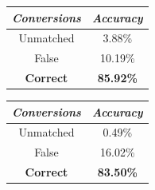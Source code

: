 \documentclass{article}
\begin{document}
\begin{minipage}{0.45\textwidth}
	\centering
	\begin{tabular}{|| c | c ||}
	\hline
	\textit{\textlatin{Conversions}} & \textit{\textlatin{Accuracy}} \\ [0.5ex]
	\hline\hline
	\textlatin{Unmatched} & 3.88\% \\
	\hline
	\textlatin{False} & 10.19\% \\
	\hline
	\textbf{\textlatin{Correct}} & \textbf{85.92\%} \\ [1ex]
	\hline
	\end{tabular}
\end{minipage}\hfill
\begin{minipage}{0.45\textwidth}
	\centering
	\begin{tabular}{|| c | c ||}
	\hline
	\textit{\textlatin{Conversions}} & \textit{\textlatin{Accuracy}} \\ [0.5ex]
	\hline\hline
	\textlatin{Unmatched} & 0.49\% \\
	\hline
	\textlatin{False} & 16.02\% \\
	\hline
	\textbf{\textlatin{Correct}} & \textbf{83.50\%} \\ [1ex]
	\hline
	\end{tabular}
\end{minipage} \\
\\
\end{document}

